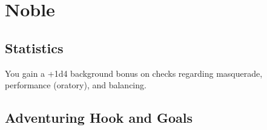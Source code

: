 \section{Noble}\label{background:noble}

\subsection{Statistics}
You gain a +1d4 background bonus on checks regarding masquerade, performance (oratory), and balancing.

\subsection{Adventuring Hook and Goals}
